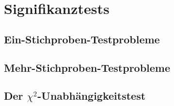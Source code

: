 \section{Signifikanztests}
\subsection{Ein-Stichproben-Testprobleme}
\subsection{Mehr-Stichproben-Testprobleme}
\subsection{Der $\chi^2$-Unabhängigkeitstest}
